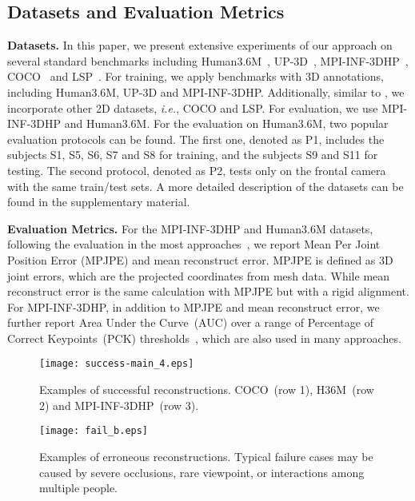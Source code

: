 \documentclass[sigplan]{acmart}
\def\ie{\emph{i.e.}}
\begin{document}
\subsection{Datasets and Evaluation Metrics}
\label{subsec:Dataset}

\textbf{Datasets.} In this paper, we present extensive experiments of our approach on several standard benchmarks including Human3.6M~\cite{2014Human3}, UP-3D~\cite{lassner2017unite}, MPI-INF-3DHP~\cite{mono-3dhp2017}, COCO~\cite{lin2014microsoft} and LSP~\cite{2010Clustered}. For training, we apply benchmarks with 3D annotations, including Human3.6M, UP-3D and MPI-INF-3DHP. Additionally, similar to \cite{kolotouros2019spin}, we incorporate other 2D datasets, \ie, COCO and LSP. For evaluation, we use MPI-INF-3DHP and Human3.6M. For the evaluation on Human3.6M, two popular evaluation protocols can be found. The first one, denoted as P1, includes the subjects S1, S5, S6, S7 and S8 for training, and the subjects S9 and S11 for testing. The second protocol, denoted as P2, tests only on the frontal camera with the same train/test sets. A more detailed description of the datasets can be found in the supplementary material. 



\textbf{Evaluation Metrics.} For the MPI-INF-3DHP and Human3.6M datasets, following the evaluation in the most approaches~\cite{Choi_2020_ECCV_Pose2Mesh,kanazawa2018end-to-end,DenseCorrespondence}, we report Mean Per Joint Position Error (MPJPE) and mean reconstruct error. MPJPE is defined as 3D joint errors, which are the projected coordinates from mesh data. While mean reconstruct error is the same calculation with MPJPE but with a rigid alignment. For MPI-INF-3DHP, in addition to MPJPE and mean reconstruct error, we further report Area Under the Curve~(AUC) over a range of Percentage of Correct Keypoints~(PCK) thresholds~\cite{mono-3dhp2017}, which are also used in many approaches\cite{DeeplyComModeccv2018,kanazawa2018end-to-end,kolotouros2019spin}.

\begin{figure*}[]
\centering
\texttt{[image: success-main\_4.eps]}
\caption{Examples of successful reconstructions. COCO~(row 1), H36M~(row 2) and MPI-INF-3DHP~(row 3).}
\label{pic:success}
\end{figure*}

\begin{figure}[]
\centering
\texttt{[image: fail\_b.eps]}
\caption{Examples of erroneous reconstructions. Typical failure cases may be caused by severe occlusions, rare viewpoint, or interactions among multiple people.}
\label{pic:fail}
\end{figure}
\end{document}
